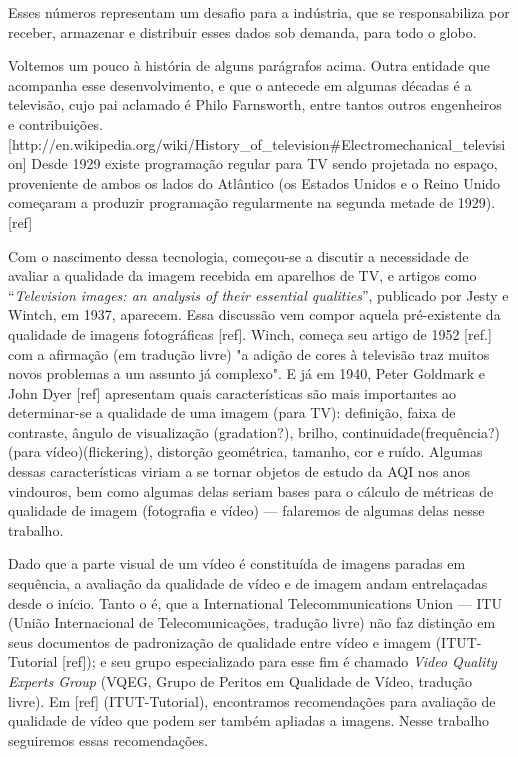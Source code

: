	Esses números representam um desafio para a indústria, que se responsabiliza por receber, armazenar e distribuir esses dados sob demanda, para todo o globo.

	Voltemos um pouco à história de alguns parágrafos acima. Outra entidade que acompanha esse desenvolvimento, e que o antecede em algumas décadas é a televisão, cujo pai aclamado é Philo Farnsworth, entre tantos outros engenheiros e contribuições. [http://en.wikipedia.org/wiki/History_of_television#Electromechanical_television] Desde 1929 existe programação regular para TV sendo projetada no espaço, proveniente de ambos os lados do Atlântico (os Estados Unidos e o Reino Unido começaram a produzir programação regularmente na segunda metade de 1929). [ref]

	Com o nascimento dessa tecnologia, começou-se a discutir a necessidade de avaliar a qualidade da imagem recebida em aparelhos de TV, e artigos como ``{\em Television images: an analysis of their essential qualities}'', publicado por Jesty e Wintch, em 1937, aparecem. Essa discussão vem compor aquela pré-existente da qualidade de imagens fotográficas [ref]. Winch, começa seu artigo de 1952 [ref.] com a afirmação (em tradução livre) "a adição de cores à televisão traz muitos novos problemas a um assunto já complexo". E já em 1940, Peter Goldmark e John Dyer [ref] apresentam quais características são mais importantes ao determinar-se a qualidade de uma imagem (para TV): definição, faixa de contraste, ângulo de visualização (gradation?), brilho, continuidade(frequência?) (para vídeo)(flickering), distorção geométrica, tamanho, cor e ruído. Algumas dessas características viriam a se tornar objetos de estudo da AQI nos anos vindouros, bem como algumas delas seriam bases para o cálculo de métricas de qualidade de imagem (fotografia e vídeo) --- falaremos de algumas delas nesse trabalho.

	Dado que a parte visual de um vídeo é constituída de imagens paradas em sequência, a avaliação da qualidade de vídeo e de imagem andam entrelaçadas desde o início. Tanto o é, que a International Telecommunications Union --- ITU (União Internacional de Telecomunicações, tradução livre) não faz distinção em seus documentos de padronização de qualidade entre vídeo e imagem (ITUT-Tutorial [ref]); e seu grupo especializado para esse fim é chamado {\em Video Quality Experts Group} (VQEG, Grupo de Peritos em Qualidade de Vídeo, tradução livre). Em [ref] (ITUT-Tutorial), encontramos recomendações para avaliação de qualidade de vídeo que podem ser também apliadas a imagens. Nesse trabalho seguiremos essas recomendações.


